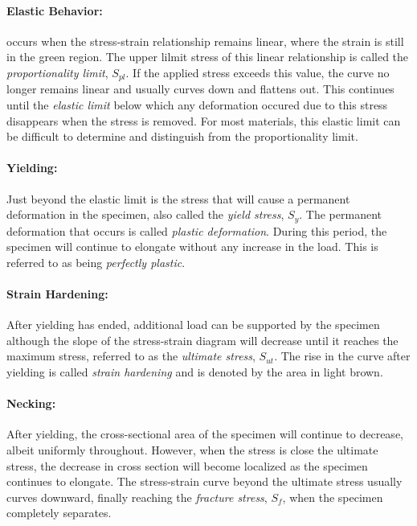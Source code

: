 \documentclass[
10pt,
a4paper,
openany,
svgnames,
]{kaobook} %
\begin{document}
\paragraph{Elastic Behavior:} occurs when the stress-strain relationship remains linear, where the strain is still in the green region. The upper lilmit stress of this linear relationship is called the \emph{proportionality limit}, $S_{pl}$. If the applied stress exceeds this value, the curve no longer remains linear and usually curves down and flattens out. This continues until the \emph{elastic limit} below which any deformation occured due to this stress disappears when the stress is removed. For most materials, this elastic limit can be difficult to determine and distinguish from the proportionality limit.

\paragraph{Yielding:} Just beyond the elastic limit is the stress that will cause a permanent deformation in the specimen, also called the \emph{yield stress}, $S_y$. The permanent deformation that occurs is called \emph{plastic deformation}. During this period, the specimen will continue to elongate without any increase in the load. This is referred to as being \emph{perfectly plastic}.

\paragraph{Strain Hardening:} After yielding has ended, additional load can be supported by the specimen although the slope of the stress-strain diagram will decrease until it reaches the maximum stress, referred to as the \emph{ultimate stress}, $S_{ut}$. The rise in the curve after yielding is called \emph{strain hardening} and is denoted by the area in light brown.

\paragraph{Necking:} After yielding, the cross-sectional area of the specimen will continue to decrease, albeit uniformly throughout. However, when the stress is close the ultimate stress, the decrease in cross section will become localized as the specimen continues to elongate. The stress-strain curve beyond the ultimate stress usually curves downward, finally reaching the \emph{fracture stress}, $S_f$, when the specimen completely separates.
\end{document}
